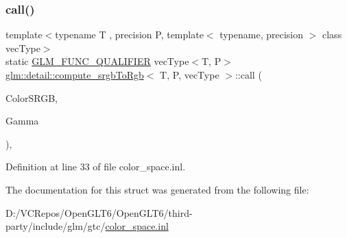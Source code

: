 \subsubsection{\texorpdfstring{call()}{call()}}
{\footnotesize\ttfamily template$<$typename T , precision P, template$<$ typename, precision $>$ class vec\+Type$>$ \\
static \mbox{\hyperlink{setup_8hpp_a33fdea6f91c5f834105f7415e2a64407}{G\+L\+M\+\_\+\+F\+U\+N\+C\+\_\+\+Q\+U\+A\+L\+I\+F\+I\+ER}} vec\+Type$<$T, P$>$ \mbox{\hyperlink{structglm_1_1detail_1_1compute__srgb_to_rgb}{glm\+::detail\+::compute\+\_\+srgb\+To\+Rgb}}$<$ T, P, vec\+Type $>$\+::call (\begin{DoxyParamCaption}\item[{vec\+Type$<$ T, P $>$ const \&}]{Color\+S\+R\+GB,  }\item[{T}]{Gamma }\end{DoxyParamCaption})\hspace{0.3cm}{\ttfamily [inline]}, {\ttfamily [static]}}



Definition at line 33 of file color\+\_\+space.\+inl.



The documentation for this struct was generated from the following file\+:\begin{DoxyCompactItemize}
\item 
D\+:/\+V\+C\+Repos/\+Open\+G\+L\+T6/\+Open\+G\+L\+T6/third-\/party/include/glm/gtc/\mbox{\hyperlink{gtc_2color__space_8inl}{color\+\_\+space.\+inl}}\end{DoxyCompactItemize}
